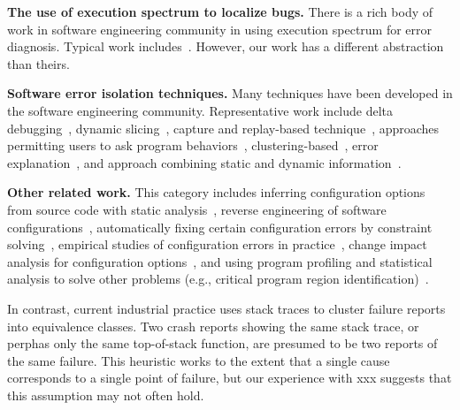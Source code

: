 \textbf{The use of execution spectrum to localize bugs.} There is a rich body of
work in software engineering community in using execution spectrum for error diagnosis.
Typical work includes~\cite{Liblit:2005:SSBI, Santelices:2009:LFU, Reps:1997:UPP,
Yilmaz:2008:TTF}. However, our work has a different abstraction than theirs.

\textbf{Software error isolation techniques.} Many techniques have been developed
in the software engineering community. Representative work include delta debugging~\cite{Zeller:2002:ICC},
dynamic slicing~\cite{Zhang:2006:LFT},
capture and replay-based technique~\cite{Qi:2011:LFE}, approaches permitting
users to ask program behaviors~\cite{Ko:2008:DRA},
clustering-based~\cite{Dickinson:2001:FFC},
error explanation~\cite{Groce:2006:EED},
and approach combining static and dynamic information~\cite{Holmes:2011:IPT, Zhang:2008:EIF}.


\textbf{Other related work.} This category includes inferring configuration options
from source code with static analysis~\cite{Rabkin:2011:SEP}, 
reverse engineering of software configurations~\cite{Wang:2008:TAR}, automatically
fixing certain configuration errors by constraint solving~\cite{rangefix},
empirical studies of configuration errors in practice~\cite{Yin:2011:ESC, Hubaux:2012},
change impact analysis for configuration options~\cite{configimpact},
and using program profiling and statistical analysis to solve
other problems (e.g., critical program region identification)~\cite{Carbin:2010:AIC}.


In contrast, current industrial practice uses stack traces to cluster
failure reports into equivalence classes. Two crash reports showing
the same stack trace, or perphas only the same top-of-stack function,
are presumed to be two reports of the same failure. This heuristic
works to the extent that a single cause corresponds to a single point
of failure, but our experience with xxx suggests that this
assumption may not often hold.
